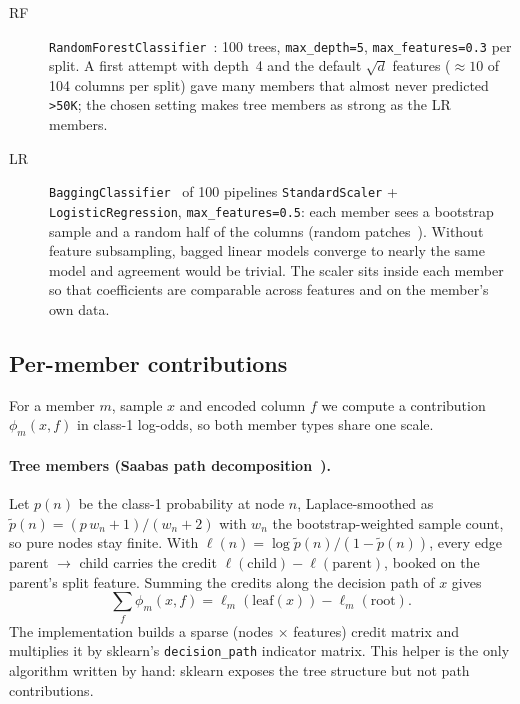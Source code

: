 \documentclass[11pt,a4paper]{article}
\newcommand{\code}[1]{\texttt{#1}}
\begin{document}
\begin{description}
  \item[RF] \code{RandomForestClassifier}~\cite{breiman2001rf}: 100 trees, \code{max\_depth=5},
    \code{max\_features=0.3} per split. A first attempt with depth~4 and the default $\sqrt{d}$ features
    ($\approx 10$ of 104 columns per split) gave many members that almost never predicted \texttt{>50K}; the
    chosen setting makes tree members as strong as the LR members.
  \item[LR] \code{BaggingClassifier}~\cite{breiman1996bagging} of 100 pipelines
    \code{StandardScaler} + \code{LogisticRegression}, \code{max\_features=0.5}: each member sees a bootstrap sample and a
    random half of the columns (random patches~\cite{louppe2012patches}). Without feature subsampling, bagged
    linear models converge to nearly the same model and agreement would be trivial. The scaler sits inside each
    member so that coefficients are comparable across features and on the member's own data.
\end{description}

\subsection{Per-member contributions}
For a member $m$, sample $x$ and encoded column $f$ we compute a contribution $\phi_m(x,f)$ in class-1 log-odds,
so both member types share one scale.

\paragraph{Tree members (Saabas path decomposition~\cite{saabas2014}).}
Let $p(n)$ be the class-1 probability at node $n$, Laplace-smoothed as $\tilde p(n) = (p\,w_n + 1)/(w_n+2)$ with
$w_n$ the bootstrap-weighted sample count, so pure nodes stay finite. With
$\ell(n) = \log \tilde p(n) / (1-\tilde p(n))$, every edge parent $\to$ child carries the credit
$\ell(\text{child}) - \ell(\text{parent})$, booked on the parent's split feature. Summing the credits along the
decision path of $x$ gives
\begin{equation}
  \sum_f \phi_m(x,f) = \ell_m(\text{leaf}(x)) - \ell_m(\text{root}).
\end{equation}
The implementation builds a sparse (nodes $\times$ features) credit matrix and multiplies it by sklearn's
\code{decision\_path} indicator matrix. This helper is the only algorithm written by hand: sklearn exposes the
tree structure but not path contributions.
\end{document}
